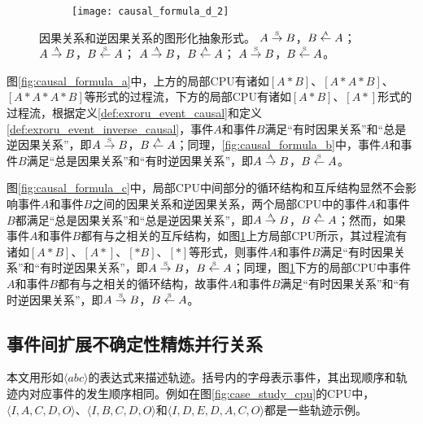 \begin{figure}[htbp]
\begin{subfigure}{0.85\textwidth}
\begin{minipage}[b]{1\textwidth}
  	  \centering
  	  \texttt{[image: causal\_formula\_d\_2]}
  	\end{minipage}
  	\caption{}
  	\label{fig:causal_formula_d}
  \end{subfigure}
  \caption{因果关系和逆因果关系的图形化抽象形式。 $A\overset{\text{\tiny{S}}}{\rightarrow}B$，$B\overset{\text{\tiny{A}}}{\leftarrow}A$； $A\overset{\text{\tiny{A}}}{\rightarrow}B$，$B\overset{\text{\tiny{S}}}{\leftarrow}A$； $A\overset{\text{\tiny{A}}}{\rightarrow}B$，$B\overset{\text{\tiny{A}}}{\leftarrow}A$； $A\overset{\text{\tiny{S}}}{\rightarrow}B$，$B\overset{\text{\tiny{S}}}{\leftarrow}A$。}
  \label{fig:event_causal_formulas}
\end{figure}

图\ref{fig:causal_formula_a}中，上方的局部CPU有诸如$[A*B]$、$[A*A*B]$、$[A*A*A*B]$等形式的过程流，下方的局部CPU有诸如$[A*B]$、$[A*]$形式的过程流，根据定义\ref{def:exroru_event_causal}和定义\ref{def:exroru_event_inverse_causal}，事件$A$和事件$B$满足“有时因果关系”和“总是逆因果关系”，即$A\overset{\text{\tiny{S}}}{\rightarrow}B$，$B\overset{\text{\tiny{A}}}{\leftarrow}A$；同理，\ref{fig:causal_formula_b}中，事件$A$和事件$B$满足“总是因果关系”和“有时逆因果关系”，即$A\overset{\text{\tiny{A}}}{\rightarrow}B$，$B\overset{\text{\tiny{S}}}{\leftarrow}A$。

图\ref{fig:causal_formula_c}中，局部CPU中间部分的循环结构和互斥结构显然不会影响事件$A$和事件$B$之间的因果关系和逆因果关系，两个局部CPU中的事件$A$和事件$B$都满足“总是因果关系”和“总是逆因果关系”，即$A\overset{\text{\tiny{A}}}{\rightarrow}B$，$B\overset{\text{\tiny{A}}}{\leftarrow}A$；然而，如果事件$A$和事件$B$都有与之相关的互斥结构，如图\ref{fig:causal_formula_d}上方局部CPU所示，其过程流有诸如$[A*B]$、$[A*]$、$[*B]$、$[*]$等形式，则事件$A$和事件$B$满足“有时因果关系”和“有时逆因果关系”，即$A\overset{\text{\tiny{S}}}{\rightarrow}B$，$B\overset{\text{\tiny{S}}}{\leftarrow}A$；同理，图\ref{fig:causal_formula_d}下方的局部CPU中事件$A$和事件$B$都有与之相关的循环结构，故事件$A$和事件$B$满足“有时因果关系”和“有时逆因果关系”，即$A\overset{\text{\tiny{S}}}{\rightarrow}B$，$B\overset{\text{\tiny{S}}}{\leftarrow}A$。

\subsection{事件间扩展不确定性精炼并行关系}\label{subsec:exroru_event_concurrent}
本文用形如$\langle abc\rangle$的表达式来描述轨迹。括号内的字母表示事件，其出现顺序和轨迹内对应事件的发生顺序相同。例如在图\ref{fig:case_study_cpu}的CPU中，$\langle I,A,C,D,O\rangle$、$\langle I,B,C,D,O\rangle$和$\langle I,D,E,D,A,C,O\rangle$都是一些轨迹示例。

